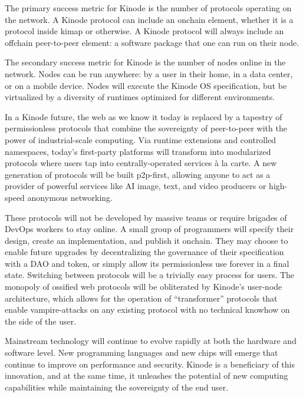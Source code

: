 \documentclass[runningheads]{llncs}
\begin{document}
The primary success metric for Kinode is the number of protocols operating on the network.
A Kinode protocol can include an onchain element, whether it is a protocol inside kimap or otherwise.
A Kinode protocol will always include an offchain peer-to-peer element: a software package that one can run on their node.

The secondary success metric for Kinode is the number of nodes online in the network.
Nodes can be run anywhere: by a user in their home, in a data center, or on a mobile device.
Nodes will execute the Kinode OS specification, but be virtualized by a diversity of runtimes optimized for different environments.

In a Kinode future, the web as we know it today is replaced by a tapestry of permissionless protocols that combine the sovereignty of peer-to-peer with the power of industrial-scale computing.
Via runtime extensions and controlled namespaces, today's first-party platforms will transform into modularized protocols where users tap into centrally-operated services à la carte.
A new generation of protocols will be built p2p-first, allowing anyone to act as a provider of powerful services like AI image, text, and video producers or high-speed anonymous networking.

These protocols will not be developed by massive teams or require brigades of DevOps workers to stay online.
A small group of programmers will specify their design, create an implementation, and publish it onchain.
They may choose to enable future upgrades by decentralizing the governance of their specification with a DAO and token, or simply allow its permissionless use forever in a final state.
Switching between protocols will be a trivially easy process for users.
The monopoly of ossified web protocols will be obliterated by Kinode's user-node architecture, which allows for the operation of ``transformer'' protocols that enable vampire-attacks on any existing protocol with no technical knowhow on the side of the user.

Mainstream technology will continue to evolve rapidly at both the hardware and software level. New programming languages and new chips will emerge that continue to improve on performance and security.
Kinode is a beneficiary of this innovation, and at the same time, it unleashes the potential of new computing capabilities while maintaining the sovereignty of the end user.
\end{document}
